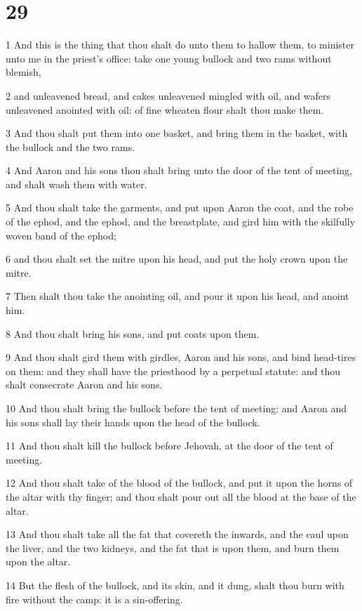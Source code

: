 \chapter{29}

\par 1 And this is the thing that thou shalt do unto them to hallow them, to minister unto me in the priest's office: take one young bullock and two rams without blemish,
\par 2 and unleavened bread, and cakes unleavened mingled with oil, and wafers unleavened anointed with oil: of fine wheaten flour shalt thou make them.
\par 3 And thou shalt put them into one basket, and bring them in the basket, with the bullock and the two rams.
\par 4 And Aaron and his sons thou shalt bring unto the door of the tent of meeting, and shalt wash them with water.
\par 5 And thou shalt take the garments, and put upon Aaron the coat, and the robe of the ephod, and the ephod, and the breastplate, and gird him with the skilfully woven band of the ephod;
\par 6 and thou shalt set the mitre upon his head, and put the holy crown upon the mitre.
\par 7 Then shalt thou take the anointing oil, and pour it upon his head, and anoint him.
\par 8 And thou shalt bring his sons, and put coats upon them.
\par 9 And thou shalt gird them with girdles, Aaron and his sons, and bind head-tires on them: and they shall have the priesthood by a perpetual statute: and thou shalt consecrate Aaron and his sons.
\par 10 And thou shalt bring the bullock before the tent of meeting: and Aaron and his sons shall lay their hands upon the head of the bullock.
\par 11 And thou shalt kill the bullock before Jehovah, at the door of the tent of meeting.
\par 12 And thou shalt take of the blood of the bullock, and put it upon the horns of the altar with thy finger; and thou shalt pour out all the blood at the base of the altar.
\par 13 And thou shalt take all the fat that covereth the inwards, and the caul upon the liver, and the two kidneys, and the fat that is upon them, and burn them upon the altar.
\par 14 But the flesh of the bullock, and its skin, and it dung, shalt thou burn with fire without the camp: it is a sin-offering.
